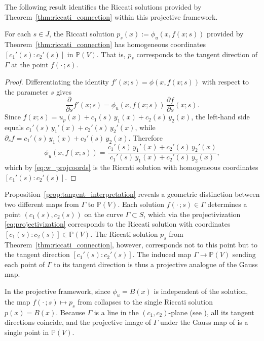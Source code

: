 \documentclass[preprint,a4paper]{elsarticle}
\begin{document}
The following result identifies the Riccati solutions provided by Theorem~\ref{thm:riccati_connection} within this projective framework.

\begin{proposition}\label{prop:tangent_interpretation}
For each $s\in J$, the Riccati solution $p_s(x):=\phi_u(x,f(x;s))$ provided by Theorem~\ref{thm:riccati_connection} has homogeneous coordinates $[c_1'(s):c_2'(s)]$ in $\mathbb{P}(V)$. That is, $p_s$ corresponds to the tangent direction of $\Gamma$ at the point $f(\cdot\,;s)$.
\end{proposition}

\begin{proof}
Differentiating the identity $f'(x;s)=\phi(x,f(x;s))$ with respect to the parameter $s$ gives
\[
\frac{\partial}{\partial s}f'(x;s)=\phi_u(x,f(x;s))\,\frac{\partial f}{\partial s}(x;s).
\]
Since $f(x;s)=u_p(x)+c_1(s)\,y_1(x)+c_2(s)\,y_2(x)$, the left-hand side equals $c_1'(s)\,y_1'(x)+c_2'(s)\,y_2'(x)$, while $\partial_s f=c_1'(s)\,y_1(x)+c_2'(s)\,y_2(x)$. Therefore
\[
\phi_u(x,f(x;s))=\frac{c_1'(s)\,y_1'(x)+c_2'(s)\,y_2'(x)}{c_1'(s)\,y_1(x)+c_2'(s)\,y_2(x)},
\]
which by \eqref{eq:w_projcoords} is the Riccati solution with homogeneous coordinates $[c_1'(s):c_2'(s)]$.
\end{proof}

\begin{remark}\label{rem:gauss_map}
Proposition~\ref{prop:tangent_interpretation} reveals a geometric distinction between two different maps from $\Gamma$ to $\mathbb{P}(V)$. Each solution $f(\cdot\,;s)\in \Gamma$ determines a point $(c_1(s),c_2(s))$ on the curve $\Gamma\subset S$, which via the projectivization \eqref{eq:projectivization} corresponds to the Riccati solution with coordinates $[c_1(s):c_2(s)]\in\mathbb{P}(V)$. The Riccati solution $p_s$ from Theorem~\ref{thm:riccati_connection}, however, corresponds not to this point but to the tangent direction $[c_1'(s):c_2'(s)]$. The induced map $\Gamma\to\mathbb{P}(V)$ sending each point of $\Gamma$ to its tangent direction is thus a projective analogue of the Gauss map.
\end{remark}



\begin{example}\label{ex:linear_proj}
In the projective framework, since $\phi_u=B(x)$ is independent of the solution, the map $f(\cdot\,;s)\mapsto p_s$ from  collapses to the single Riccati solution $p(x)=B(x)$. Because $\Gamma$ is a line in the $(c_1,c_2)$-plane (see ), all its tangent directions coincide, and the projective image of $\Gamma$ under the Gauss map of  is a single point in $\mathbb{P}(V)$.
\end{example}
\end{document}
